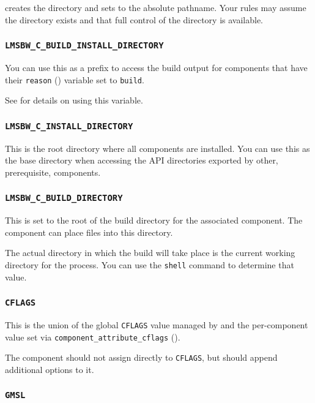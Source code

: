 \lmsbw creates the directory and sets \destdir to the absolute
pathname.  Your rules may assume the directory exists and that full
control of the directory is available.


\subsubsection{\texttt{LMSBW\_C\_BUILD\_INSTALL\_DIRECTORY}}\label{wrap:build-install-directory}

You can use this as a prefix to access the build output for components
that have their \texttt{reason} () variable set
to \texttt{build}.

See  for details on using this variable.

\subsubsection{\texttt{LMSBW\_C\_INSTALL\_DIRECTORY}}

This is the root directory where all components are installed.  You
can use this as the base directory when accessing the API directories
exported by other, prerequisite, components.

\subsubsection{\texttt{LMSBW\_C\_BUILD\_DIRECTORY}}

This is set to the root of the build directory for the associated
component.  The component \makefile can place files into this
directory.

The actual directory in which the build will take place is the current
working directory for the \make process.  You can use the \gnumake
\texttt{shell} command to determine that value.

\subsubsection{\texttt{CFLAGS}}

This is the union of the global \texttt{CFLAGS} value managed by
\lmsbw and the per-component value set via
\texttt{\texttt{component\_attribute\_cflags}} ().

The component \makefile should not assign directly to \texttt{CFLAGS},
but should append additional options to it.

\subsubsection{\texttt{GMSL}}

